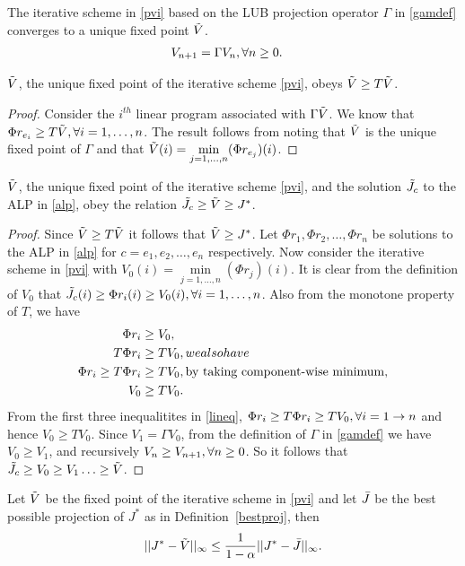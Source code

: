 \documentclass[12pt,draftcls,onecolumn]{IEEEtran}
\begin{document}
\begin{corollary}
The iterative scheme in \eqref{pvi} based on the LUB projection operator $\Gamma$ in \eqref{gamdef} converges to a unique fixed point $\tilde{V}$.
\begin{align}\label{pvi}
V_{n+1}&=\Gamma V_n,\mb \forall n\geq 0.
\end{align}
\end{corollary}
\begin{lemma}\label{gfp}
 $\tilde{V}$, the unique fixed point of the iterative scheme \eqref{pvi}, obeys $\tilde{V}\geq T\tilde{V}$.
\end{lemma}
\begin{proof}
Consider the $i^{th}$ linear program associated with $\Gamma \tilde{V}$. We know that $\Phi r_{e_i}\geq T \tilde{V},\relax{ } \forall i=1,\ldots, n$. The result follows from noting that $\tilde{V}$ is the unique fixed point of $\Gamma $ and that $\tilde{V}(i)=\underset{j=1,\ldots,n}{\min}(\Phi r_{e_j})(i)$.
\end{proof}
\begin{lemma}\label{relation1}
 $\tilde{V}$, the unique fixed point of the iterative scheme \eqref{pvi}, and the solution $\tilde{J}_c$ to the ALP in \eqref{alp}, obey the relation $\tilde{J}_c\geq\tilde{V}\geq J^*$.
\end{lemma}
\begin{proof}
Since $\tilde{V}\geq T\tilde{V}$ it follows that $\tilde{V}\geq J^*$. Let $\Phi r_1, \Phi r_2,\ldots,\Phi r_n$ be solutions to the ALP in \eqref{alp} for $c=e_1, e_2,\ldots,e_n$ respectively. Now consider the iterative scheme in \eqref{pvi} with $V_0(i)=\underset{j=1,\ldots, n}{\min}(\Phi r_j)(i)$. It is clear from the definition of $V_0$ that $\tilde{J}_c(i)\geq\Phi r_i(i)\geq V_0(i),\relax{ } \forall i=1,\ldots,n$. Also from the monotone property of $T$, we have 
\begin{align}\label{lineq}
\Phi r_i&\geq V_0,\nn\\
T\Phi r_i&\geq T V_0,\mbox{we also have}\nn\\
\Phi r_i\geq T\Phi r_i&\geq T V_0,\mb\text{by taking component-wise minimum},\nn\\
V_0&\geq T V_0.
\end{align}
From the first three inequalitites in \eqref{lineq}, $\Phi r_i\geq T \Phi r_i\geq T V_0, \relax{ }\forall i=1\to n$ and hence $V_0\geq TV_0$. Since $V_1=\Gamma V_0$, from the definition of $\Gamma$ in \eqref{gamdef} we have $V_0\geq V_1$, and recursively $V_{n}\geq V_{n+1}, \relax{ }\forall n\geq 0$. So it follows that $\tilde{J}_c\geq V_0\geq V_1\ldots\geq \tilde{V}$.
\end{proof}
\begin{theorem}\label{fxpres}
Let $\tilde{V}$ be the fixed point of the iterative scheme in \eqref{pvi} and let $\bar{J}$ be the best possible projection of $J^*$ as in Definition~\ref{bestproj}, then
\begin{align}
||J^*-\tilde{V}||_\infty\leq \frac{1}{1-\alpha}||J^*-\bar{J}||_\infty.
\end{align}
\end{theorem}
\end{document}
